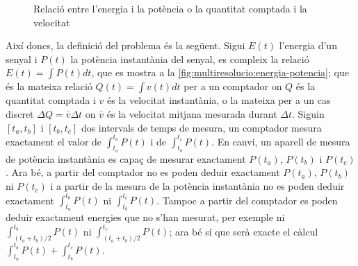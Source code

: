 \begin{figure}[tp]
  \centering


      \caption{Relació entre l'energia i la potència o la quantitat
        comptada i la velocitat}
  \label{fig:multiresolucio:energia-potencia}
\end{figure}




Així doncs, la definició del problema és la següent.  Sigui $E(t)$
l'energia d'un senyal i $P(t)$ la potència instantània del senyal, es
compleix la relació $E(t)=\int P(t) dt$, que es mostra a la
\autoref{fig:multiresolucio:energia-potencia}; que és la mateixa
relació $Q(t)=\int v(t) dt$ per a un comptador on $Q$ és la quantitat
comptada i $v$ és la velocitat instantània, o la mateixa per a un cas
discret $\Delta Q = \bar{v} \Delta t$ on $\bar{v}$ és la velocitat
mitjana mesurada durant $\Delta t$. %
  Siguin
  $[t_a,t_b]$ i $[t_b,t_c]$ dos intervals de temps de mesura, un
  comptador mesura exactament el valor de $\int_{t_a}^{t_b} P(t)$ i de
  $\int_{t_b}^{t_c} P(t)$. En canvi, un aparell de mesura de potència
  instantània es capaç de mesurar exactament $P(t_a)$, $P(t_b)$ i
  $P(t_c)$. Ara bé, a partir del comptador no es poden deduir
  exactament $P(t_a)$, $P(t_b)$ ni $P(t_c)$ i a partir de la mesura de
  la potència instantània no es poden deduir exactament
  $\int_{t_a}^{t_b} P(t)$ ni $\int_{t_b}^{t_c} P(t)$. Tampoc a partir
  del comptador es poden deduir exactament energies que no s'han
  mesurat, per exemple ni $\int_{(t_a+t_b)/2}^{t_b} P(t)$ ni
  $\int_{(t_a+t_b)/2}^{t_c} P(t)$; ara bé sí que serà exacte el càlcul
  $\int_{t_a}^{t_b} P(t)+\int_{t_b}^{t_c} P(t)$.
  

